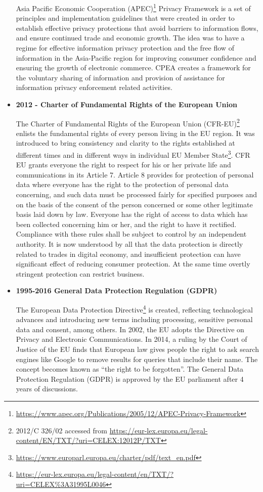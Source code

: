 \begin{multicols}{2}
\begin{itemize}
Asia Pacific Economic Cooperation (APEC)\footnote{\url{https://www.apec.org/Publications/2005/12/APEC-Privacy-Framework}} Privacy Framework is a set of principles and implementation guidelines that were created in order to establish effective privacy protections that avoid barriers to information flows, and ensure continued trade and economic growth. The idea was to have a regime for effective information privacy protection and the free flow of information in the Asia-Pacific region for improving consumer confidence and ensuring the growth of electronic commerce. CPEA creates a framework for the voluntary sharing of information and provision of assistance for information privacy enforcement related activities. 

\item[{\bf 4.}]\textbf{2012 - Charter of Fundamental Rights of the European Union}

The Charter of Fundamental Rights of the European Union (CFR-EU)\footnote{2012/C 326/02 accessed from \url{ https://eur-lex.europa.eu/legal-content/EN/TXT/?uri=CELEX:12012P/TXT}} enlists the fundamental rights of every person living in the EU region. It was introduced to bring consistency and clarity to the rights established at different times and in different ways in individual EU Member State\footnote{\url{https://www.europarl.europa.eu/charter/pdf/text\_en.pdf}}. CFR EU grants everyone the right to respect for his or her private life and communications in its Article 7. Article 8 provides for protection of personal data where everyone has the right to the protection of personal data concerning, and such data must be processed fairly for specified purposes and on the basis of the consent of the person concerned or some other legitimate basis laid down by law. Everyone has the right of access to data which has been collected concerning him or her, and the right to have it rectified. Compliance with these rules shall be subject to control by an independent authority. It is now understood by all that the data protection is directly related to trades in digital economy, and insufficient protection can have significant effect of reducing consumer protection. At the same time overtly stringent protection can restrict business.

\item[{\bf 5.}]\textbf{1995-2016 General Data Protection Regulation (GDPR)}

The European Data Protection Directive\footnote{\url{https://eur-lex.europa.eu/legal-content/en/TXT/?uri=CELEX\%3A31995L0046}} is created, reflecting technological advances and introducing new terms including processing, sensitive personal data and consent, among others. In 2002, the EU adopts the Directive on Privacy and Electronic Communications. In 2014, a ruling by the Court of Justice of the EU finds that European law gives people the right to ask search engines like Google to remove results for queries that include their name. The concept becomes known as “the right to be forgotten”. The General Data Protection Regulation (GDPR) is approved by the EU parliament after 4 years of discussions.
\end{itemize}


\end{multicols}
